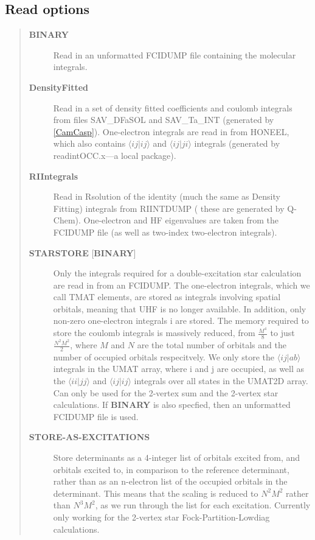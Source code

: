 \documentclass[openany,a4paper,10pt,english]{manual}
\newcommand{\bra}{\ensuremath{\langle}}
\newcommand{\ket}{\ensuremath{\rangle}}
\begin{document}
\subsection{Read options}
\begin{quote}
\begin{description}
\item[\textbf{BINARY}] \leavevmode
Read in an unformatted FCIDUMP file containing the molecular
integrals.

\item[\textbf{DensityFitted}] \leavevmode
Read in a set of density fitted coefficients and coulomb integrals
from files SAV\_DFaSOL and SAV\_Ta\_INT (generated by \hyperlink{camcasp}{{[}CamCasp{]}}).
One-electron integrals are read in from HONEEL, which also contains
$\bra ij | ij \ket$ and $\bra ij | ji \ket$ integrals
(generated by readintOCC.x---a local package).

\item[\textbf{RIIntegrals}] \leavevmode
Read in Rsolution of the identity (much the same as Density Fitting)
integrals from RIINTDUMP ( these are generated by Q-Chem).
One-electron and HF eigenvalues are taken from
the FCIDUMP file (as well as two-index two-electron integrals).

\item[\textbf{STARSTORE} {[}\textbf{BINARY}{]}] \leavevmode
Only the integrals required for a double-excitation star
calculation are read in from an FCIDUMP.  The one-electron
integrals, which we call TMAT elements, are stored as integrals
involving spatial orbitals, meaning that UHF is no longer
available.  In addition, only non-zero one-electron integrals i
are stored. The memory required to store the coulomb integrals
is massively reduced, from  $\frac{M^4}{8}$ to just
$\frac{N^{2} M^{2}}{2}$, where $M$ and $N$ are
the total number of orbitals and the number of occupied orbitals
respecitvely.  We only store the $\bra ij | ab \ket$
integrals in the UMAT array, where i and j are occupied, as well
as the $\bra ii | jj \ket$ and $\bra ij | ij \ket$
integrals over all states in the UMAT2D array.  Can only
be used for the 2-vertex sum and the 2-vertex star calculations.
If \textbf{BINARY} is also specfied, then an unformatted FCIDUMP file
is used.

\item[\textbf{STORE-AS-EXCITATIONS}] \leavevmode
Store determinants as a 4-integer list of orbitals excited from, and
orbitals excited to, in comparison to the reference determinant,
rather than as an n-electron list of the occupied orbitals
in the determinant. This means that the scaling is reduced to
$N^2M^2$ rather than $N^3M^2$, as we run through the
list for each excitation.  Currently only working for the 2-vertex
star Fock-Partition-Lowdiag calculations.

\end{description}
\end{quote}
\end{document}

